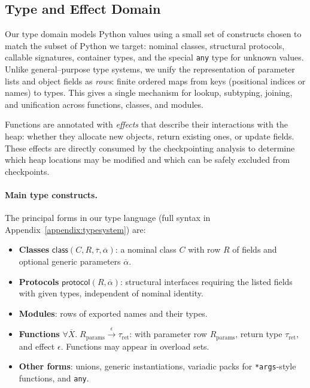 \subsection{Type and Effect Domain}

Our type domain models Python values using a small set of constructs chosen to match the subset of Python we target: nominal classes, structural protocols, callable signatures, container types, and the special \texttt{any} type for unknown values.
Unlike general--purpose type systems, we unify the representation of parameter lists and object fields as \emph{rows}: finite ordered maps from keys (positional indices or names) to types.  
This gives a single mechanism for lookup, subtyping, joining, and unification across functions, classes, and modules.

Functions are annotated with \emph{effects} that describe their interactions with the heap: whether they allocate new objects, return existing ones, or update fields.  
These effects are directly consumed by the checkpointing analysis to determine which heap locations may be modified and which can be safely excluded from checkpoints.

\paragraph{Main type constructs.}
The principal forms in our type language (full syntax in Appendix~\ref{appendix:typesystem}) are:
\begin{itemize}
  \item \textbf{Classes} $\mathsf{class}(C, R, \overline{\tau}, \overline{\alpha})$:
        a nominal class $C$ with row $R$ of fields and optional generic parameters $\overline{\alpha}$.
  \item \textbf{Protocols} $\mathsf{protocol}(R, \overline{\alpha})$:
        structural interfaces requiring the listed fields with given types, independent of nominal identity.
  \item \textbf{Modules}:
        rows of exported names and their types.
  \item \textbf{Functions} $\forall \overline{X}.\;R_{\mathrm{params}} \xrightarrow{\epsilon} \tau_{\mathrm{ret}}$:
        with parameter row $R_{\mathrm{params}}$, return type $\tau_{\mathrm{ret}}$, and effect $\epsilon$.
        Functions may appear in overload sets.
  \item \textbf{Other forms}:
        unions, generic instantiations, variadic packs for \texttt{*args}-style functions, and \texttt{any}.
\end{itemize}

